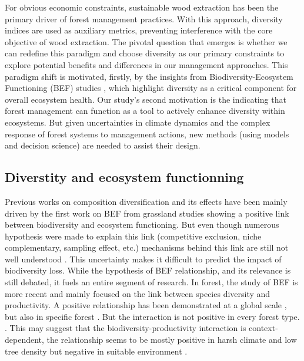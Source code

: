 \documentclass{article}
\begin{document}
For obvious economic constraints, sustainable wood extraction has been the primary driver of forest management practices. With this approach, diversity indices are used as auxiliary metrics, preventing interference with the core objective of wood extraction. The pivotal question that emerges is whether we can redefine this paradigm and choose diversity as our primary constraints to explore potential benefits and differences in our management approaches. This paradigm shift is motivated, firstly, by the insights from Biodiversity-Ecosystem Functioning (BEF) studies \autocite{tilmanBiodiversityPopulationEcosystem1996}, which highlight diversity as a critical component for overall ecosystem health. Our study's second motivation is the indicating that forest management can function as a tool to actively enhance diversity within ecosystems. But given uncertainties in climate dynamics and the complex response of forest systems to management actions, new methods (using models and decision science) are needed to assist their design.

\subsection{Diverstity and ecosystem functionning}

Previous works on composition diversification and its effects have been mainly driven by the first work on BEF from grassland studies \autocite{tilmanBiodiversityPopulationEcosystem1996} showing a positive link between biodiversity and ecosystem functioning. But even though numerous hypothesis were made to explain this link (competitive exclusion, niche complementary, sampling effect, etc.) mechanisms behind this link are still not well understood \autocite{aliBiodiversityEcosystemFunctioning2023}. This uncertainty makes it difficult to predict the impact of biodiversity loss.
While the hypothesis of BEF relationship, and its relevance is still debated, it fuels an entire segment of research.
In forest, the study of BEF is more recent and mainly focused on the link between species diversity and productivity. A positive relationship has been demonstrated at a global scale \autocite{liangPositiveBiodiversityproductivityRelationship2016}, but also in specific forest \autocite{morinTreeSpeciesRichness2011,paquetteEffectBiodiversityTree2011,jourdanManagingMixedStands2021}. But the interaction is not positive in every forest type. \autocite{forresterReviewProcessesDiversity2016}.
This may suggest that the biodiversity-productivity interaction is context-dependent, the relationship seems to be mostly positive in harsh climate and low tree density but negative in suitable environment \autocite{juckerClimateModulatesEffects2016}.
\end{document}
